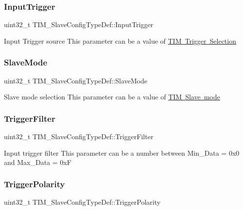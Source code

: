 \subsubsection{\texorpdfstring{InputTrigger}{InputTrigger}}
{\footnotesize\ttfamily uint32\+\_\+t T\+I\+M\+\_\+\+Slave\+Config\+Type\+Def\+::\+Input\+Trigger}

Input Trigger source This parameter can be a value of \mbox{\hyperlink{group___t_i_m___trigger___selection}{T\+IM Trigger Selection}} \mbox{\label{struct_t_i_m___slave_config_type_def_a2792de155698128ade1e505618c1bc43}} 
\subsubsection{\texorpdfstring{SlaveMode}{SlaveMode}}
{\footnotesize\ttfamily uint32\+\_\+t T\+I\+M\+\_\+\+Slave\+Config\+Type\+Def\+::\+Slave\+Mode}

Slave mode selection This parameter can be a value of \mbox{\hyperlink{group___t_i_m___slave___mode}{T\+IM Slave mode}} \mbox{\label{struct_t_i_m___slave_config_type_def_a07d28f704576a41e37bbb7412e0fba60}} 
\subsubsection{\texorpdfstring{TriggerFilter}{TriggerFilter}}
{\footnotesize\ttfamily uint32\+\_\+t T\+I\+M\+\_\+\+Slave\+Config\+Type\+Def\+::\+Trigger\+Filter}

Input trigger filter This parameter can be a number between Min\+\_\+\+Data = 0x0 and Max\+\_\+\+Data = 0xF \mbox{\label{struct_t_i_m___slave_config_type_def_afa8fa1801ef5e13115732a495ef11165}} 
\subsubsection{\texorpdfstring{TriggerPolarity}{TriggerPolarity}}
{\footnotesize\ttfamily uint32\+\_\+t T\+I\+M\+\_\+\+Slave\+Config\+Type\+Def\+::\+Trigger\+Polarity}

